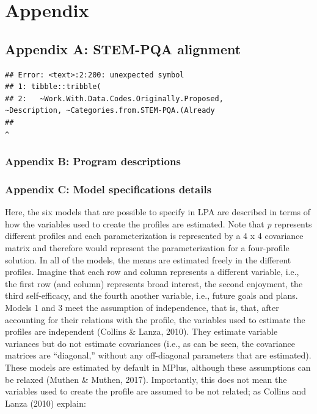 \documentclass[]{book}
\theoremstyle{definition}
\theoremstyle{definition}
\theoremstyle{definition}
\theoremstyle{remark}
\begin{document}
\chapter{Appendix}\label{appendix}

\section{Appendix A: STEM-PQA
alignment}\label{appendix-a-stem-pqa-alignment}

\begin{verbatim}
## Error: <text>:2:200: unexpected symbol
## 1: tibble::tribble(
## 2:   ~Work.With.Data.Codes.Originally.Proposed,                                                                                                    ~Description, ~Categories.from.STEM-PQA.(Already
##                                                                                                                                                                                                           ^
\end{verbatim}

\subsection{Appendix B: Program
descriptions}\label{appendix-b-program-descriptions}

\subsection{Appendix C: Model specifications
details}\label{appendix-c-model-specifications-details}

Here, the six models that are possible to specify in LPA are described
in terms of how the variables used to create the profiles are estimated.
Note that \emph{p} represents different profiles and each
parameterization is represented by a 4 x 4 covariance matrix and
therefore would represent the parameterization for a four-profile
solution. In all of the models, the means are estimated freely in the
different profiles. Imagine that each row and column represents a
different variable, i.e., the first row (and column) represents broad
interest, the second enjoyment, the third self-efficacy, and the fourth
another variable, i.e., future goals and plans. Models 1 and 3 meet the
assumption of independence, that is, that, after accounting for their
relations with the profile, the variables used to estimate the profiles
are independent (Collins \& Lanza, 2010). They estimate variable
variances but do not estimate covariances (i.e., as can be seen, the
covariance matrices are ``diagonal,'' without any off-diagonal
parameters that are estimated). These models are estimated by default in
MPlus, although these assumptions can be relaxed (Muthen \& Muthen,
2017). Importantly, this does not mean the variables used to create the
profile are assumed to be not related; as Collins and Lanza (2010)
explain:
\end{document}
